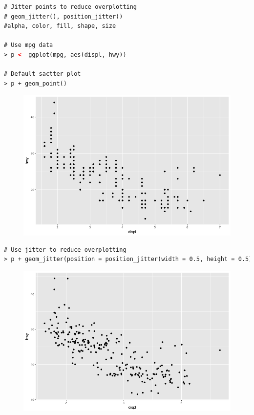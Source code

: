 \begin{lstlisting}[language=html]
# Jitter points to reduce overplotting
# geom_jitter(), position_jitter()
#alpha, color, fill, shape, size

# Use mpg data
> p <- ggplot(mpg, aes(displ, hwy))

# Default sactter plot
> p + geom_point()
\end{lstlisting}
\begin{figure}[H]\begin{center}\includegraphics[scale=1 ]{ilu/bg53.png}\end{center}\end{figure}
\begin{lstlisting}[language=html]
# Use jitter to reduce overplotting
> p + geom_jitter(position = position_jitter(width = 0.5, height = 0.5))
\end{lstlisting}
\begin{figure}[H]\begin{center}\includegraphics[scale=1 ]{ilu/bg54.png}\end{center}\end{figure}
